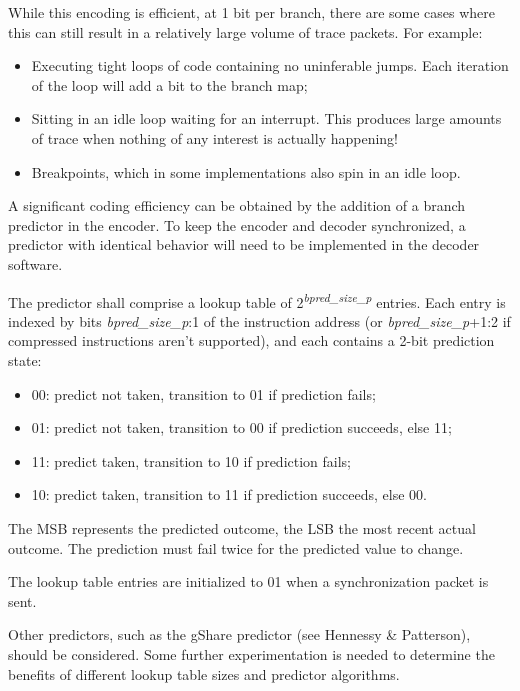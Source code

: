 While this encoding is efficient, at 1 bit per branch, there are some cases where this
can still result in a relatively large volume of trace packets.  For example:

\begin{itemize}
  \item Executing tight loops of code containing no uninferable jumps.  Each iteration of the loop will add a bit 
  to the branch map;
  \item Sitting in an idle loop waiting for an interrupt.  This produces large amounts of trace when nothing of 
  any interest is actually happening!  
  \item Breakpoints, which in some implementations also spin in an idle loop.
\end{itemize}

A significant coding efficiency can be obtained by the addition of a branch predictor in the encoder. To keep
the encoder and decoder synchronized, a predictor with identical behavior will need to be implemented in the decoder
software.

The predictor shall comprise a lookup table of 2\textsuperscript{\textit{bpred\_size\_p}} entries.  
Each entry is indexed by bits \textit{bpred\_size\_p}:1 of the instruction address (or \textit{bpred\_size\_p}+1:2 if 
compressed instructions aren't supported), 
and each contains a 2-bit prediction state:
\begin{itemize}
  \item 00: predict not taken, transition to 01 if prediction fails;
  \item 01: predict not taken, transition to 00 if prediction succeeds, else 11;
  \item 11: predict taken, transition to 10 if prediction fails;
  \item 10: predict taken, transition to 11 if prediction succeeds, else 00.
\end{itemize}

The MSB represents the predicted outcome, the LSB the most recent actual outcome.  The prediction must fail twice
for the predicted value to change.

The lookup table entries are initialized to 01 when a synchronization packet is sent.

Other predictors, such as the gShare predictor (see Hennessy \& Patterson), should be considered.  Some further
experimentation is needed to determine the benefits of different lookup table sizes and predictor algorithms.


